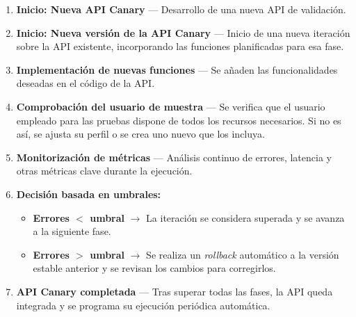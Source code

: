 \begin{enumerate}
    \item \textbf{Inicio: Nueva API Canary} --- Desarrollo de una nueva API de validación.

    \item \textbf{Inicio: Nueva versión de la API Canary} --- Inicio de una nueva iteración sobre la API existente, incorporando las funciones planificadas para esa fase.

    \item \textbf{Implementación de nuevas funciones} --- Se añaden las funcionalidades deseadas en el código de la API.

    \item \textbf{Comprobación del usuario de muestra} --- Se verifica que el usuario empleado para las pruebas dispone de todos los recursos necesarios. Si no es así, se ajusta su perfil o se crea uno nuevo que los incluya.

    \item \textbf{Monitorización de métricas} --- Análisis continuo de errores, latencia y otras métricas clave durante la ejecución.

    \item \textbf{Decisión basada en umbrales:}
          \begin{itemize}
              \item \textbf{Errores $<$ umbral} $\rightarrow$ La iteración se considera superada y se avanza a la siguiente fase.
              \item \textbf{Errores $>$ umbral} $\rightarrow$ Se realiza un \textit{rollback} automático a la versión estable anterior y se revisan los cambios para corregirlos.
          \end{itemize}

    \item \textbf{API Canary completada} --- Tras superar todas las fases, la API queda integrada y se programa su ejecución periódica automática.
\end{enumerate}




